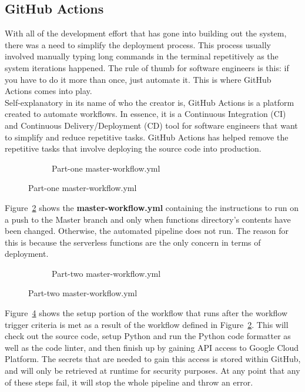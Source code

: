 \documentclass{article}
\begin{document}
\subsection{GitHub Actions}
With all of the development effort that has gone into building out the system, there was a need to simplify the deployment process. This process usually involved manually typing long commands in the terminal repetitively as the system iterations happened. The rule of thumb for software engineers is this: if you have to do it more than once, just automate it. This is where GitHub Actions comes into play.\\

Self-explanatory in its name of who the creator is, GitHub Actions is a platform created to automate workflows. In essence, it is a Continuous Integration (CI) and Continuous Delivery/Deployment (CD) tool for software engineers that want to simplify and reduce repetitive tasks. GitHub Actions has helped remove the repetitive tasks that involve deploying the source code into production.

\begin{figure}[H]
    \begin{figure}[H]
        
        \caption{Part-one master-workflow.yml}
        \label{fig:workflow-file-one}
    \end{figure}
\end{figure}

Figure~\ref{fig:workflow-file-one} shows the \textbf{master-workflow.yml} containing the instructions to run on a push to the Master branch and only when functions directory's contents have been changed. Otherwise, the automated pipeline does not run. The reason for this is because the serverless functions are the only concern in terms of deployment.

\begin{figure}[H]
    \begin{figure}[H]
        
        \caption{Part-two master-workflow.yml}
        \label{fig:workflow-file-two}
    \end{figure}
\end{figure}

Figure~\ref{fig:workflow-file-two} shows the setup portion of the workflow that runs after the workflow trigger criteria is met as a result of the workflow defined in Figure~\ref{fig:workflow-file-one}. This will check out the source code, setup Python and run the Python code formatter as well as the code linter, and then finish up by gaining API access to Google Cloud Platform. The secrets that are needed to gain this access is stored within GitHub, and will only be retrieved at runtime for security purposes. At any point that any of these steps fail, it will stop the whole pipeline and throw an error.\\
\end{document}

